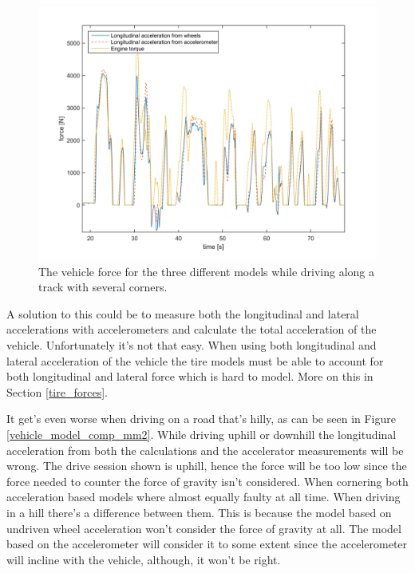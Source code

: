 \begin{figure}[h]
	\centering
	\includegraphics[width=1\textwidth]{Pictures/vehicle_model_comp_race}
	\caption{The vehicle force for the three different models while driving along a track with several corners.}
	\label{vehicle_model_comp_race}
\end{figure}

A solution to this could be to measure both the longitudinal and lateral accelerations with accelerometers and calculate the total acceleration of the vehicle. Unfortunately it's not that easy. When using both longitudinal and lateral acceleration of the vehicle the tire models must be able to account for both longitudinal and lateral force which is hard to model. More on this in Section \ref{tire_forces}.

It get's even worse when driving on a road that's hilly, as can be seen in Figure \ref{vehicle_model_comp_mm2}. While driving uphill or downhill the longitudinal acceleration from both the calculations and the accelerator measurements will be wrong. The drive session shown is uphill, hence the force will be too low since the force needed to counter the force of gravity isn't considered. When cornering both acceleration based models where almost equally faulty at all time. When driving in a hill there's a difference between them. This is because the model based on undriven wheel acceleration won't consider the force of gravity at all. The model based on the accelerometer will consider it to some extent since the accelerometer will incline with the vehicle, although, it won't be right.

